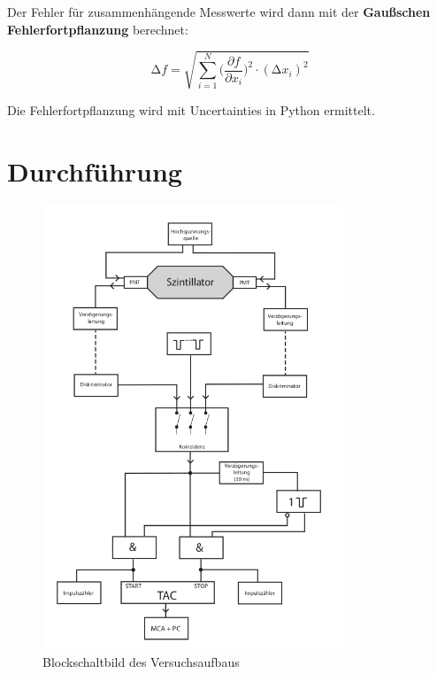 Der Fehler für zusammenhängende Messwerte wird dann mit der \textbf{Gaußschen Fehlerfortpflanzung} berechnet:

\begin{equation}
	\increment{f} = \sqrt{ \sum_{i = 1}^{N}  \biggl(\frac{\partial{f}}{\partial{x_i}}\biggr)^2\cdot(\increment{x_i})^2}
	\label{eqn:Gauss}
\end{equation}

Die Fehlerfortpflanzung wird mit Uncertainties in Python \cite{uncertainties} ermittelt.


\section{Durchführung \cite{man}}

\begin{figure}
	\centering
	\includegraphics[width=0.8\textwidth]{./Bilder/aufbau.png}
	\caption{Blockschaltbild des Versuchsaufbaus}\label{fig:aufbau}
\end{figure}

